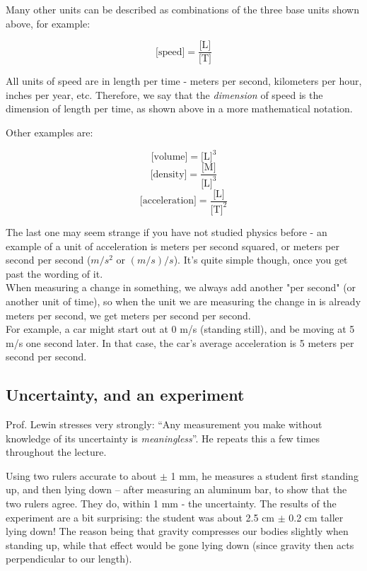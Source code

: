 \documentclass[12pt,a4paper]{report}
\begin{document}
Many other units can be described as combinations of the three base units shown above, for example:

\begin{equation}
 \text{[speed]} = \frac{\text{[L]}}{\text{[T]}}
\end{equation}

All units of speed are in length per time - meters per second, kilometers per hour, inches per year, etc. Therefore, we say that the \emph{dimension} of speed is the dimension of length per time, as shown above in a more mathematical notation.

Other examples are:

\begin{equation}
 \text{[volume]} =\text{[L]}^3
\end{equation}
\begin{equation}
 \text{[density]} = \frac{\text{[M]}}{\text{[L]}^3}
\end{equation}
\begin{equation}
 \text{[acceleration]} = \frac{\text{[L]}}{\text{[T]}^2}
\end{equation}

The last one may seem strange if you have not studied physics before - an example of a unit of acceleration is meters per second squared, or meters per second per second ($m/s^2$ or $(m/s)/s$). It's quite simple though, once you get past the wording of it.\\
When measuring a change in something, we always add another "per second" (or another unit of time), so when the unit we are measuring the change in is already meters per second, we get meters per second per second.\\
For example, a car might start out at 0 m/s (standing still), and be moving at 5 m/s one second later. In that case, the car's average acceleration is 5 meters per second per second.

\subsection{Uncertainty, and an experiment}
Prof. Lewin stresses very strongly: ``Any measurement you make without knowledge of its uncertainty is \emph{meaningless}''. He repeats this a few times throughout the lecture.

Using two rulers accurate to about $\pm$ 1 mm, he measures a student first standing up, and then lying down -- after measuring an aluminum bar, to show that the two rulers agree. They do, within 1 mm - the uncertainty.
The results of the experiment are a bit surprising: the student was about 2.5 cm $\pm$ 0.2 cm taller lying down! The reason being that gravity compresses our bodies slightly when standing up, while that effect would be gone lying down (since gravity then acts perpendicular to our length).
\end{document}

